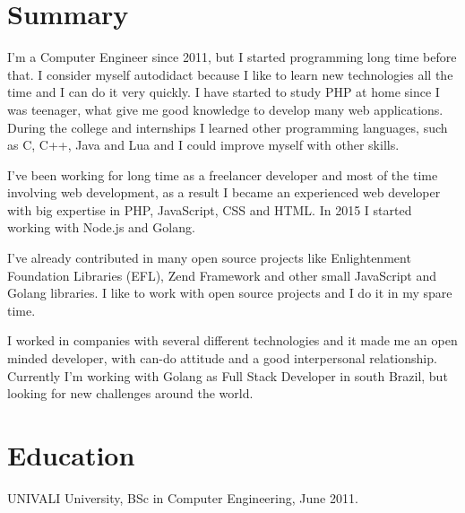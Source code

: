 \documentclass[margin]{res}
\begin{document}
\address{Berlin, DE \\ xguiga@gmail.com \\ Phone: +49 (173) 979-9383 }

\begin{resume}

\section{Summary}
I'm a Computer Engineer since 2011, but I started programming long time before that. I consider myself autodidact because I like to learn new technologies all the time and I can do it very quickly. I have started to study PHP at home since I was teenager, what give me good knowledge to develop many web applications.  During the college and internships I learned other programming languages, such as C, C++, Java and Lua and I could improve myself with other skills.

I've been working for long time as a freelancer developer and most of the time involving web development, as a result I became an experienced web developer with big expertise in PHP, JavaScript, CSS and HTML. In 2015 I started working with Node.js and Golang. 

I've already contributed in many open source projects like Enlightenment Foundation Libraries (EFL), Zend Framework and other small JavaScript and Golang libraries. I like to work with open source projects and I do it in my spare time.

I worked in companies with several different technologies and it made me an open minded developer, with can-do attitude and a good interpersonal relationship. Currently I’m working with Golang as Full Stack Developer in south Brazil, but looking for new challenges around the world.

\section{Education} UNIVALI University, BSc in Computer Engineering, June 2011.


\end{resume}
\end{document}
